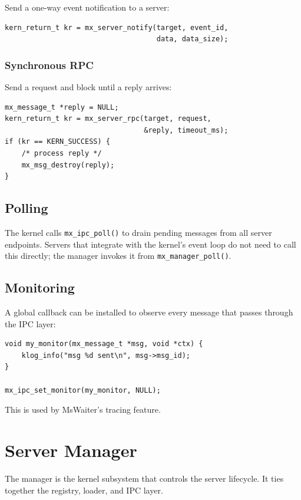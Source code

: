 \documentclass[a4paper,11pt]{article}
\begin{document}
Send a one-way event notification to a server:

\begin{lstlisting}
kern_return_t kr = mx_server_notify(target, event_id,
                                    data, data_size);
\end{lstlisting}

\subsubsection{Synchronous RPC}

Send a request and block until a reply arrives:

\begin{lstlisting}
mx_message_t *reply = NULL;
kern_return_t kr = mx_server_rpc(target, request,
                                 &reply, timeout_ms);
if (kr == KERN_SUCCESS) {
    /* process reply */
    mx_msg_destroy(reply);
}
\end{lstlisting}

\subsection{Polling}

The kernel calls \texttt{mx\_ipc\_poll()} to drain pending messages
from all server endpoints. Servers that integrate with the kernel's
event loop do not need to call this directly; the manager invokes it
from \texttt{mx\_manager\_poll()}.

\subsection{Monitoring}

A global callback can be installed to observe every message that
passes through the IPC layer:

\begin{lstlisting}
void my_monitor(mx_message_t *msg, void *ctx) {
    klog_info("msg %d sent\n", msg->msg_id);
}

mx_ipc_set_monitor(my_monitor, NULL);
\end{lstlisting}

This is used by MsWaiter's tracing feature.

\section{Server Manager}

The manager is the kernel subsystem that controls the server
lifecycle. It ties together the registry, loader, and IPC layer.
\end{document}
